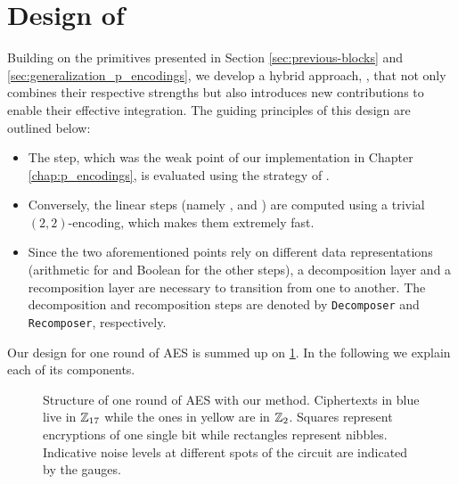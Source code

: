 \section{Design of \hippo}
\label{sec:hippogryph_our_work}

Building on the primitives presented in Section \ref{sec:previous-blocks} and \ref{sec:generalization_p_encodings}, we develop a hybrid approach, \hippo, that not only combines their respective strengths but also introduces new contributions to enable their effective integration. The guiding principles of this design are outlined below:

\begin{itemize}
    \item The \SubBytes step, which was the weak point of our implementation in Chapter \ref{chap:p_encodings}, is evaluated using the strategy of \cite{DBLP:conf/wahc/TramaCBS23}.
    \item Conversely, the linear steps (namely \ShiftRows, \MixColumns and \AddRoundKey) are computed using a trivial $(2, 2)$-encoding, which makes them extremely fast.
    \item Since the two aforementioned points rely on different data representations (arithmetic for \SubBytes and Boolean for the other steps), a decomposition layer and a recomposition layer are necessary to transition from one to another. The decomposition and recomposition steps are denoted by \texttt{Decomposer} and \texttt{Recomposer}, respectively. %
\end{itemize}

Our design for one round of \gls{AES} is summed up on \ref{fig:our_design}. In the following we explain each of its components.

%

\begin{figure}
	\centering
	
	\caption{Structure of one round of \gls{AES} with our method. Ciphertexts in blue live in $\mathbb{Z}_{17}$ while the ones in yellow are in $\mathbb{Z}_2$. Squares represent encryptions of one single bit while rectangles represent nibbles. Indicative noise levels at different spots of the circuit are indicated by the gauges.} 
	\label{fig:our_design}
\end{figure}



